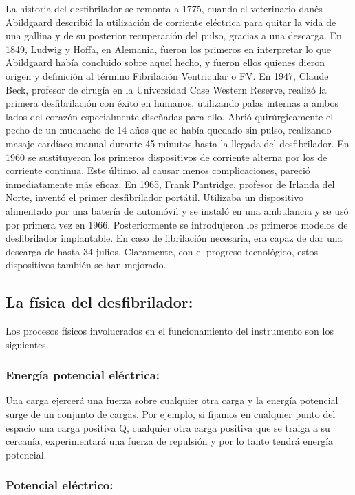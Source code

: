 La historia del desfibrilador se remonta a 1775, cuando el veterinario danés Abildgaard describió la utilización de corriente eléctrica para quitar la vida de una gallina y de su posterior recuperación del pulso, gracias a una descarga. En 1849, Ludwig y Hoffa, en Alemania, fueron los primeros en interpretar lo que Abildgaard había concluido sobre aquel hecho, y fueron ellos quienes dieron origen y definición al término Fibrilación Ventricular o FV. En 1947, Claude Beck, profesor de cirugía en la Universidad Case Western Reserve, realizó la primera desfibrilación con éxito en humanos, utilizando palas internas a ambos lados del corazón especialmente diseñadas para ello. Abrió quirúrgicamente el pecho de un muchacho de 14 años que se había quedado sin pulso, realizando masaje cardíaco manual durante 45 minutos hasta la llegada del desfibrilador. \newline \hfill \break
En 1960 se sustituyeron los primeros dispositivos de corriente alterna por los de corriente continua. Este último, al causar menos complicaciones, pareció inmediatamente más eficaz. En 1965, Frank Pantridge, profesor de Irlanda del Norte, inventó el primer desfibrilador portátil. Utilizaba un dispositivo alimentado por una batería de automóvil y se instaló en una ambulancia y se usó por primera vez en 1966. Posteriormente se introdujeron los primeros modelos de desfibrilador implantable. En caso de fibrilación necesaria, era capaz de dar una descarga de hasta 34 julios. Claramente, con el progreso tecnológico, estos dispositivos también se han mejorado.

\subsection{La física del desfibrilador:}

Los procesos físicos involucrados en el funcionamiento del instrumento son los siguientes.

\subsubsection{Energía potencial eléctrica:}
Una carga ejercerá una fuerza sobre cualquier otra carga y la energía potencial surge de un conjunto de cargas. Por ejemplo, si fijamos en cualquier punto del espacio una carga positiva Q, cualquier otra carga positiva que se traiga a su cercanía, experimentará una fuerza de repulsión y por lo tanto tendrá energía potencial.

\subsubsection{Potencial eléctrico:}

